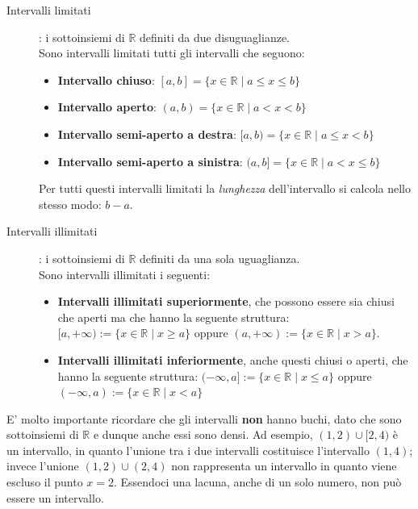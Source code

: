 \documentclass[12pt]{report}
\newcommand{\R}{\mathbb{R}}
\begin{document}
	\begin{description}
		
		\item [Intervalli limitati]: i sottoinsiemi di $\R$ definiti da due disuguaglianze.\\
		Sono intervalli limitati tutti gli intervalli che seguono:
		\begin{itemize}
			
			\item \textbf{Intervallo chiuso}: $[a, b] = \{x \in \R \mid a \leq x \leq b\}$
			
			\item \textbf{Intervallo aperto}: $(a, b) = \{x \in \R \mid a < x < b\}$
			
			\item \textbf{Intervallo semi-aperto a destra}: $[a, b) = \{x \in \R \mid a \leq x < b\}$
			
			\item \textbf{Intervallo semi-aperto a sinistra}: $(a, b] = \{x \in \R \mid a < x \leq b\}$
			
		\end{itemize}
		
		Per tutti questi intervalli limitati la \textit{lunghezza} dell'intervallo si calcola nello stesso modo: $b - a$.
		
		\item [Intervalli illimitati]: i sottoinsiemi di $\R$ definiti da una sola uguaglianza.\\
		Sono intervalli illimitati i seguenti:
		\begin{itemize}
			
			\item \textbf{Intervalli illimitati superiormente}, che possono essere sia chiusi che aperti ma che hanno la seguente struttura: $[a, +\infty) := \{x \in \R \mid x \geq a\}$ oppure $(a, +\infty) := \{x \in \R \mid x > a\}$.
			
			\item \textbf{Intervalli illimitati inferiormente}, anche questi chiusi o aperti, che hanno la seguente struttura: $(-\infty, a] := \{x \in \R \mid x \leq a\}$ oppure $(-\infty, a) := \{x \in \R \mid x < a\}$
			
		\end{itemize}
		
	\end{description}
	
	E' molto importante ricordare che gli intervalli \textbf{non} hanno buchi, dato che sono sottoinsiemi di $\R$ e dunque anche essi sono densi.
	Ad esempio, $(1, 2) \cup [2, 4)$ è un intervallo, in quanto l'unione tra i due intervalli costituisce l'intervallo $(1, 4)$; invece l'unione $(1, 2) \cup (2, 4)$ non rappresenta un intervallo in quanto viene escluso il punto $x = 2$. Essendoci una lacuna, anche di un solo numero, non può essere un intervallo.
	
\end{document}

